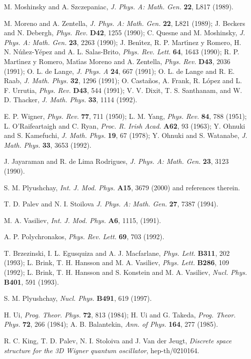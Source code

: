 \documentclass[a4paper,dvips,12pt]{article}
\begin{document}
\begin{thebibliography}{99}

 M. Moshinsky and A. Szczepaniac, {\it J. Phys. A: Math.
Gen.} {\bf 22}, L817 (1989).

 M. Moreno and A. Zentella, {\it J. Phys. A: Math. Gen.} {\bf 22}, L821 (1989); J. Beckers and N. Debergh,
{\it Phys. Rev.} {\bf D42}, 1255 (1990); C. Quesne and M. Moshinsky,
{\it J. Phys. A: Math. Gen.} {\bf 23}, 2263 (1990);
J. Ben\'\i tez, R. P. Mart\'\i nez y Romero, H. N.
N\'u\~nez-Y\'epez and A. L. Salas-Brito, {\it Phys. Rev. Lett.}
{\bf 64}, 1643 (1990);  R. P. Mart\'\i nez y Romero,
Mat\'\i as Moreno and A. Zentella, {\it Phys. Rev.} {\bf D43}, 2036 (1991);
O. L. de Lange,
{\it J. Phys. A} {\bf 24}, 667 (1991);
O. L. de Lange and R. E. Raab,
{\it J. Math. Phys.} {\bf 32}, 1296 (1991);
O. Casta\~nos, A. Frank, R. L\'opez and L. F. Urrutia,
{\it Phys. Rev.} {\bf D43}, 544 (1991);
V. V. Dixit, T. S. Santhanam, and W. D. Thacker,
{\it J. Math. Phys.} {\bf 33}, 1114 (1992).



 E. P. Wigner, {\it Phys. Rev. } {\bf 77},  711 (1950);
 L. M. Yang, {\it Phys. Rev. } {\bf 84},  788 (1951);
L. O'Raifeartaigh  and   C. Ryan, {\it Proc. R. Irish Acad.}  {\bf A62}, 93
(1963); Y. Ohnuki  and S. Kamefuchi, {\it  J. Math. Phys.} {\bf 19},  67
(1978); Y. Ohnuki  and S. Watanabe, {\it  J. Math. Phys.} {\bf 33},  3653
(1992).

 J. Jayaraman  and R. de Lima Rodrigues,
{\it J. Phys. A:  Math.  Gen.}  {\bf 23},  3123 (1990).

 S. M. Plyushchay, {\it Int. J. Mod. Phys.}
{\bf A15}, 3679 (2000) and references therein.

 T. D. Palev and  N. I. Stoilova
{\it J. Phys. A:  Math.  Gen.} {\bf 27}, 7387 (1994).


 M. A. Vasiliev, {\it Int. J. Mod. Phys.} {\bf A6},
1115, (1991).

 A. P. Polychronakos,
{\it Phys. Rev. Lett.} {\bf 69}, 703 (1992).

T. Brzezinski, I. L. Egusquiza and A. J. Macfarlane,
{\it Phys. Lett.} {\bf B311}, 202 (1993); L. Brink, T. H. Hansson and
M. A. Vasiliev, {\it Phys. Lett.} {\bf B286}, 109 (1992);
L. Brink, T. H. Hansson and
S. Konstein and M. A. Vasiliev, {\it Nucl. Phys.} {\bf B401}, 591 (1993).

 S. M. Plyushchay, {\it Nucl. Phys.} {\bf B491}, 619 (1997).


 H. Ui,  {\it Prog. Theor. Phys.} {\bf 72},
813 (1984); H. Ui and G. Takeda, {\it Prog. Theor. Phys.} {\bf 72}, 266
(1984); A. B. Balantekin,  {\it Ann. of Phys.} {\bf 164}, 277 (1985).

 R. C. King, T. D. Palev, N. I. Stoloiva
and J. Van der Jeugt, {\it Discrete space structure for the 3D Wigner quantum
oscillator}, hep-th/0210164.


\end{thebibliography}
\end{document}
